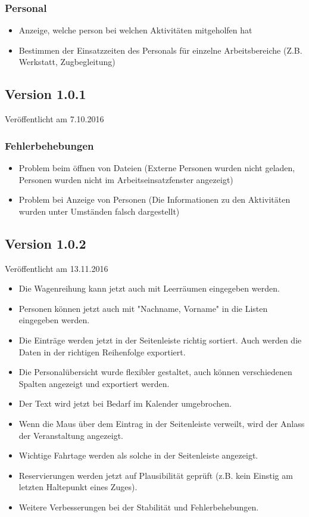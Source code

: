 \subsubsection{Personal}
\begin{itemize}
  \item
  Anzeige, welche person bei welchen Aktivitäten mitgeholfen hat
  \item
  Bestimmen der Einsatzzeiten des Personals für einzelne Arbeitsbereiche (Z.B. Werkstatt, Zugbegleitung)
\end{itemize}


\subsection{Version 1.0.1}
Veröffentlicht am 7.10.2016
\subsubsection{Fehlerbehebungen}
\begin{itemize}
  \item Problem beim öffnen von Dateien (Externe Personen wurden nicht geladen, Personen wurden nicht im Arbeitseinsatzfenster angezeigt)
  \item Problem bei Anzeige von Personen (Die Informationen zu den Aktivitäten wurden unter Umständen falsch dargestellt)
\end{itemize}


\subsection{Version 1.0.2}
Veröffentlicht am 13.11.2016
\begin{itemize}
  \item
  Die Wagenreihung kann jetzt auch mit Leerräumen eingegeben werden.
  \item
  Personen können jetzt auch mit "Nachname, Vorname" in die Listen eingegeben werden.
  \item
  Die Einträge werden jetzt in der Seitenleiste richtig sortiert. Auch werden die Daten in der richtigen Reihenfolge exportiert.
  \item
  Die Personalübersicht wurde flexibler gestaltet, auch können verschiedenen Spalten angezeigt und exportiert werden.
  \item
  Der Text wird jetzt bei Bedarf im Kalender umgebrochen.
  \item
  Wenn die Maus über dem Eintrag in der Seitenleiste verweilt, wird der Anlass der Veranstaltung angezeigt.
  \item
  Wichtige Fahrtage werden als solche in der Seitenleiste angezeigt.
  \item
  Reservierungen werden jetzt auf Plausibilität geprüft (z.B. kein Einstig am letzten Haltepunkt eines Zuges).
  \item
  Weitere Verbesserungen bei der Stabilität und Fehlerbehebungen.
\end{itemize}


